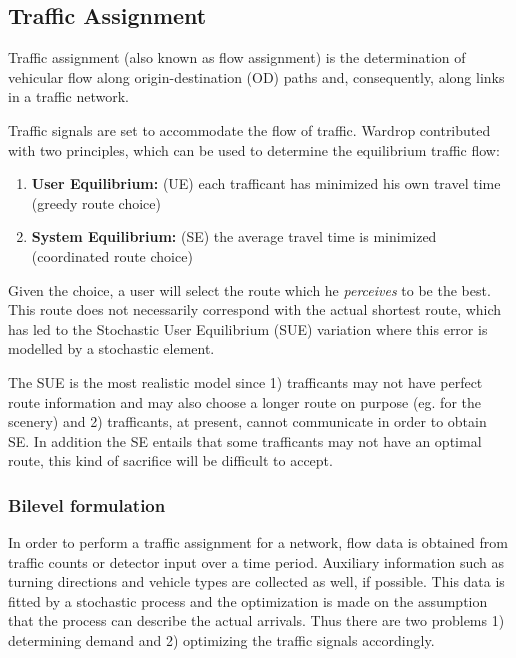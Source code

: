 \subsection{Traffic Assignment}
\label{sec:usereq}

Traffic assignment (also known as flow assignment) is the
determination of vehicular flow along origin-destination (OD) paths
and, consequently, along links in a traffic network.

Traffic signals are set to accommodate the flow of traffic. Wardrop
contributed with two principles, which can be used to determine the
equilibrium traffic flow:

\begin{enumerate}
\item \textbf{User Equilibrium:} (UE) each trafficant has minimized his own travel time (greedy route choice)
\item \textbf{System Equilibrium:} (SE) the average travel time is minimized (coordinated route choice)
\end{enumerate}

Given the choice, a user will select the route which he
\textit{perceives} to be the best. This route does not necessarily
correspond with the actual shortest route, which has led to the
Stochastic User Equilibrium (SUE) variation \cite{32} where this error
is modelled by a stochastic element.

The SUE is the most realistic model since 1) trafficants may not have
perfect route information and may also choose a longer route on
purpose (eg. for the scenery) and 2) trafficants, at present, cannot
communicate in order to obtain SE. In addition the SE entails that
some trafficants may not have an optimal route, this kind of sacrifice
will be difficult to accept.

\subsubsection*{Bilevel formulation}
\label{sec:bilevel}

In order to perform a traffic assignment for a network, flow data is
obtained from traffic counts or detector input over a time
period. Auxiliary information such as turning directions and vehicle
types are collected as well, if possible. This data is fitted by a
stochastic process and the optimization is made on the assumption that
the process can describe the actual arrivals. Thus there are two
problems 1) determining demand and 2) optimizing the traffic signals
accordingly.

